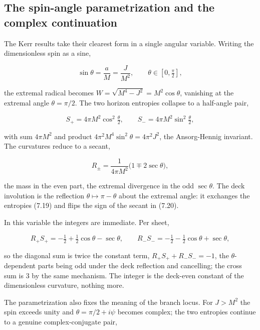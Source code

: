 \documentclass[11pt]{article}
\begin{document}
\subsection{The spin-angle parametrization and the complex continuation}

The Kerr results take their clearest form in a single angular variable. Writing the dimensionless spin as a sine,

\begin{equation*}
\sin\theta = \frac{a}{M} = \frac{J}{M^2}, \qquad \theta \in \left[0, \tfrac{\pi}{2}\right],
\tag{7.18}
\end{equation*}

the extremal radical becomes $W = \sqrt{M^4 - J^2} = M^2\cos\theta$, vanishing at the extremal angle $\theta = \pi/2$. The two horizon entropies collapse to a half-angle pair,

\begin{equation*}
S_+ = 4\pi M^2 \cos^2\tfrac{\theta}{2}, \qquad S_- = 4\pi M^2 \sin^2\tfrac{\theta}{2},
\tag{7.19}
\end{equation*}

with sum $4\pi M^2$ and product $4\pi^2 M^4\sin^2\theta = 4\pi^2 J^2$, the Ansorg-Hennig invariant. The curvatures reduce to a secant,

\begin{equation*}
R_\pm = \frac{1}{4\pi M^2}\big(1 \mp 2\sec\theta\big),
\tag{7.20}
\end{equation*}

the mass in the even part, the extremal divergence in the odd $\sec\theta$. The deck involution is the reflection $\theta \mapsto \pi - \theta$ about the extremal angle: it exchanges the entropies (7.19) and flips the sign of the secant in (7.20).

In this variable the integers are immediate. Per sheet,

\begin{equation*}
R_+ S_+ = -\tfrac12 + \tfrac12\cos\theta - \sec\theta, \qquad R_- S_- = -\tfrac12 - \tfrac12\cos\theta + \sec\theta,
\tag{7.21}
\end{equation*}

so the diagonal sum is twice the constant term, $R_+S_+ + R_-S_- = -1$, the $\theta$-dependent parts being odd under the deck reflection and cancelling; the cross sum is $3$ by the same mechanism. The integer is the deck-even constant of the dimensionless curvature, nothing more.

The parametrization also fixes the meaning of the branch locus. For $J > M^2$ the spin exceeds unity and $\theta = \pi/2 + i\psi$ becomes complex; the two entropies continue to a genuine complex-conjugate pair,
\end{document}
